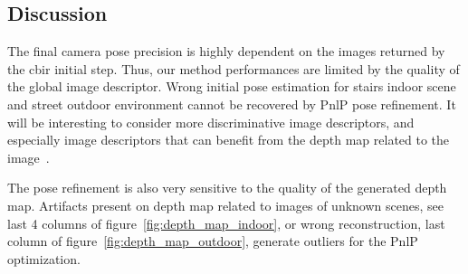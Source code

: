 \subsection{Discussion}
The final camera pose precision is highly dependent on the images returned by the \ac{cbir} initial step. Thus, our method performances are limited by the quality of the global image descriptor. Wrong initial pose estimation for stairs indoor scene and street outdoor environment cannot be recovered by PnlP pose refinement. It will be interesting to consider more discriminative image descriptors, and especially image descriptors that can benefit from the depth map related to the image~\citep{Piasco2019}.

The pose refinement is also very sensitive to the quality of the generated depth map. Artifacts present on depth map related to images of unknown scenes, see last 4 columns of figure~\ref{fig:depth_map_indoor}, or wrong reconstruction, last column of figure~\ref{fig:depth_map_outdoor}, generate outliers for the PnlP optimization. 

